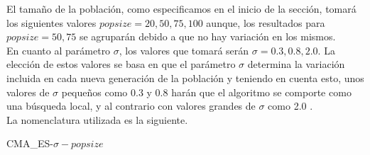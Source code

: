 El tamaño de la población, como especificamos en el inicio de la sección, tomará los siguientes valores $popsize = 20, 50, 75, 100$ aunque, los resultados para $popsize = 50, 75$ se agruparán debido a que no hay variación en los mismos. \\
En cuanto al parámetro $\sigma$, los valores que tomará serán $\sigma = 0.3, 0.8, 2.0$. La elección de estos valores se basa en que el parámetro $\sigma$ determina la variación incluida en cada nueva generación de la población y teniendo en cuenta esto, unos valores de $\sigma$ pequeños como 0.3 y 0.8 harán que el algoritmo se comporte como una búsqueda local, y al contrario con valores grandes de $\sigma$ como 2.0 \cite{CMA1}. \\

La nomenclatura utilizada es la siguiente. \\
\centerline{CMA\_ES-$\sigma-popsize$}
\begin{table}[!ht]
  \caption{Comparativa del algoritmo CMA-ES.}
\end{table}
\newpage
